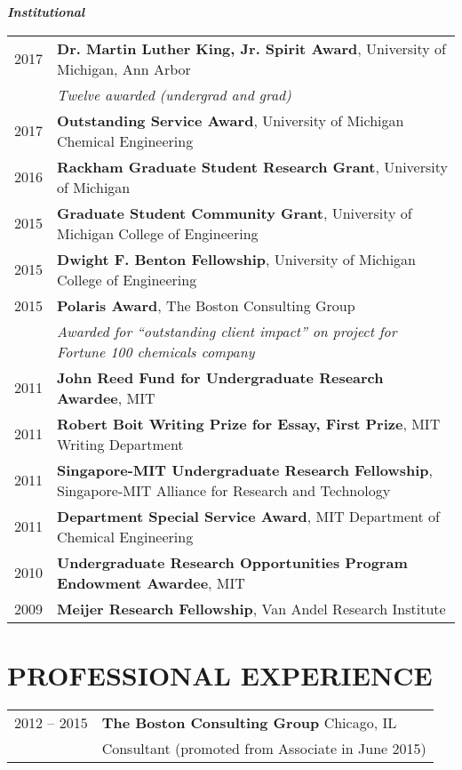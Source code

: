 \documentclass[11pt]{article}
\newcommand{\quotejump}{\vspace{0.5em}}
\begin{document}
\textbf{\textit{Institutional}}\quotejump
\begin{longtable}{R{2.2cm} L{14.8cm}}
2017 & \textbf{Dr. Martin Luther King, Jr. Spirit Award}, University of Michigan, Ann Arbor \\
& \footnotesize{\textit{Twelve awarded (undergrad and grad)}} \\ 
2017 & \textbf{Outstanding Service Award}, University of Michigan Chemical Engineering \\
2016 & \textbf{Rackham Graduate Student Research Grant}, University of Michigan \\
2015 & \textbf{Graduate Student Community Grant}, University of Michigan College of Engineering \\
2015 & \textbf{Dwight F. Benton Fellowship}, University of Michigan College of Engineering \\
2015 & \textbf{Polaris Award}, The Boston Consulting Group \\
& \footnotesize{\textit{Awarded for ``outstanding client impact'' on project for Fortune 100 chemicals company}} \\
2011 & \textbf{John Reed Fund for Undergraduate Research Awardee}, MIT \\
2011 & \textbf{Robert Boit Writing Prize for Essay, First Prize}, MIT Writing Department \\
2011 & \textbf{Singapore-MIT Undergraduate Research Fellowship}, Singapore-MIT Alliance for Research and Technology \\
2011 & \textbf{Department Special Service Award}, MIT Department of Chemical Engineering \\
2010 & \textbf{Undergraduate Research Opportunities Program Endowment Awardee}, MIT \\
2009 & \textbf{Meijer Research Fellowship}, Van Andel Research Institute \\
\end{longtable}


\section{PROFESSIONAL EXPERIENCE}
\begin{longtable}{R{2.2cm} L{14.8cm}}
2012 -- 2015 & \textbf{The Boston Consulting Group} \hfill Chicago, IL \\
& Consultant (promoted from Associate in June 2015) \\
\end{longtable}
\end{document}
